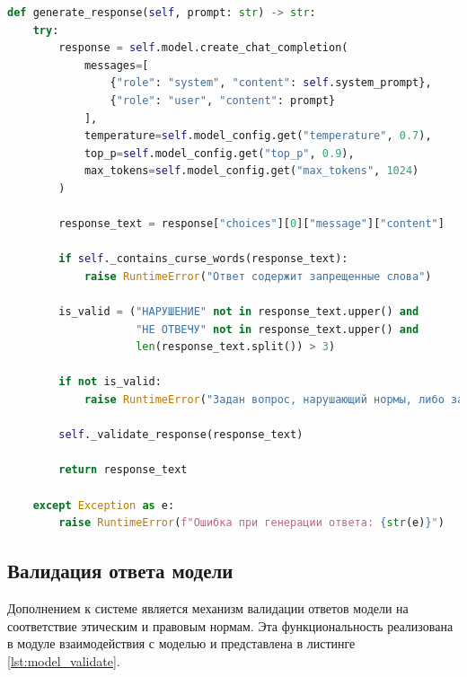 \newpage

\begin{lstlisting}[caption={Генерация ответа языковой модели с валидацией}, label=lst:model_generate, language=Python]
def generate_response(self, prompt: str) -> str:
	try:
		response = self.model.create_chat_completion(
			messages=[
				{"role": "system", "content": self.system_prompt},
				{"role": "user", "content": prompt}
			],
			temperature=self.model_config.get("temperature", 0.7),
			top_p=self.model_config.get("top_p", 0.9),
			max_tokens=self.model_config.get("max_tokens", 1024)
		)

		response_text = response["choices"][0]["message"]["content"]

		if self._contains_curse_words(response_text):
			raise RuntimeError("Ответ содержит запрещенные слова")

		is_valid = ("НАРУШЕНИЕ" not in response_text.upper() and 
					"НЕ ОТВЕЧУ" not in response_text.upper() and
					len(response_text.split()) > 3)

		if not is_valid:
			raise RuntimeError("Задан вопрос, нарушающий нормы, либо задан не вопрос.")
		
		self._validate_response(response_text)

		return response_text
		
	except Exception as e:
		raise RuntimeError(f"Ошибка при генерации ответа: {str(e)}")
\end{lstlisting}

\subsection{Валидация ответа модели}

Дополнением к системе является механизм валидации ответов модели на соответствие этическим и правовым нормам. Эта функциональность реализована в модуле взаимодействия с моделью и представлена в листинге \ref{lst:model_validate}.

\newpage

